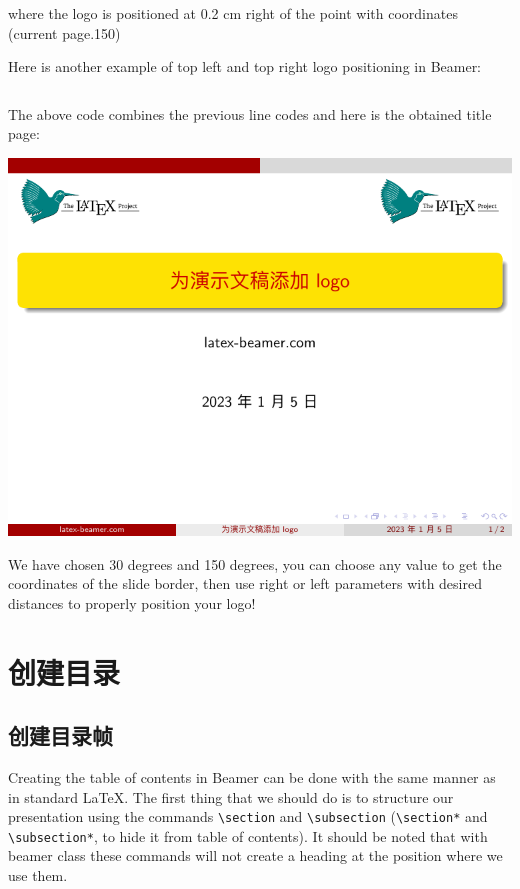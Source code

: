where the logo is positioned at 0.2 cm right of the point with coordinates (current page.150)

Here is another example of top left and top right logo positioning in Beamer:

\inputminted[linenos=true]{latex}{examples/beamer/logo-position3.tex}

The above code combines the previous line codes and here is the obtained title page:

\includegraphics[page=1]{examples/beamer/logo-position3.pdf}

We have chosen 30 degrees and 150 degrees, you can choose any value to get the coordinates of the slide border, then use right or left parameters with desired distances to properly position your logo!

\section{创建目录}

\subsection{创建目录帧}

Creating the table of contents in Beamer can be done with the same manner as in standard {\LaTeX}. The first thing that we should do is to structure our presentation using the commands \verb|\section| and \verb|\subsection| (\verb|\section*| and \verb|\subsection*|, to hide it from table of contents). It should be noted that with beamer class these commands will not create a heading at the position where we use them.

